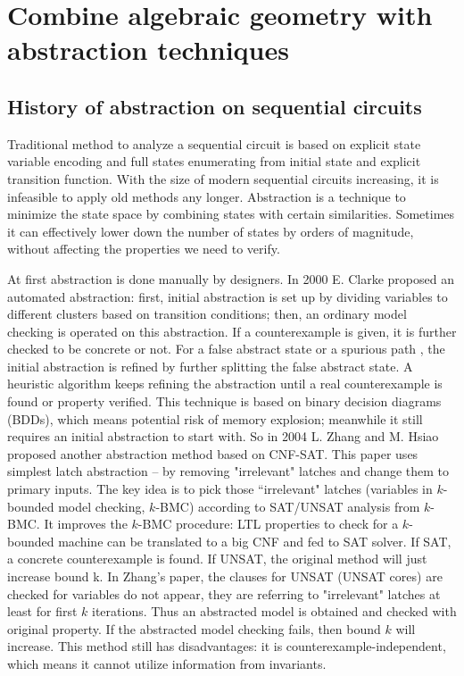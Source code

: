 \section{Combine algebraic geometry with abstraction techniques}
\subsection{History of abstraction on sequential circuits}
Traditional method to analyze a sequential circuit is based on explicit state variable encoding
and full states enumerating from initial state and explicit transition function.
With the size of modern sequential circuits increasing, it is infeasible to apply old methods
any longer. Abstraction is a technique to minimize the state space by combining states with certain 
similarities. Sometimes it can effectively lower down the number of states by orders of magnitude,
without affecting the properties we need to verify.

At first abstraction is done manually by designers. In 2000 E. Clarke \cite{clarke2000counterexample}
proposed an automated abstraction: first,
initial abstraction is set up by dividing variables to different clusters based on transition conditions;
then, an ordinary model checking is operated on this abstraction. If a counterexample is given, 
it is further checked to be concrete or not. For a false abstract state or a spurious path 
, the initial abstraction is refined by further splitting the false abstract state. 
A heuristic algorithm keeps refining the abstraction until a real counterexample is found or 
property verified. This technique is based on binary decision diagrams (BDDs), which means
potential risk of memory explosion; meanwhile it still requires an initial abstraction to start with.
So in 2004 L. Zhang and M. Hsiao \cite{zhang2005design} proposed another abstraction method based on CNF-SAT.
This paper uses simplest latch abstraction -- by removing "irrelevant" latches and change them to primary inputs. 
The key idea is to pick those ``irrelevant" latches (variables in $k$-bounded model checking, $k$-BMC) 
according to SAT/UNSAT analysis from $k$-BMC. It improves the $k$-BMC procedure\cite{biere1999symbolic}: 
LTL properties to check for a $k$-bounded machine can be translated to a big CNF and fed to SAT solver. 
If SAT, a concrete counterexample is found. 
If UNSAT, the original method will just increase bound k. In Zhang's paper, the clauses for UNSAT 
(UNSAT cores) are checked for variables do not appear, they are referring to "irrelevant" latches 
at least for first $k$ iterations. 
Thus an abstracted model is obtained and checked with original property. If the abstracted model checking fails, 
then bound $k$ will increase. This method still has disadvantages: it is counterexample-independent,
which means it cannot utilize information from invariants.


